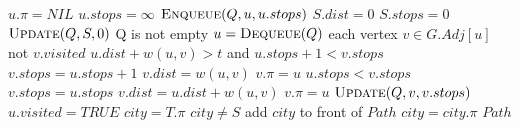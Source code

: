 \documentclass[11pt]{article}
\theoremstyle{nonumberplain}
\begin{document}
\begin{enumerate}
\begin{codebox}
\li     $u.\pi=NIL$
\li     $u.stops=\infty$
\li     $\textnormal{\scshape Enqueue}(Q,u,u.stops)$
    \End
\li $S.dist=0$
\li $S.stops=0$
\li $\textnormal{\scshape Update}(Q,S,0)$
\li \While Q is not empty \Do
\li     $u=\textnormal{\scshape Dequeue}(Q)$
\li     \For each vertex $v \in G.Adj[u]$ \Do
\li         \If not $v.visited$ \Do
\li             \If $u.dist+w(u,v)>t$ and $u.stops+1<v.stops$ \Do
\li                 $v.stops=u.stops+1$
\li                 $v.dist=w(u,v)$
\li                 $v.\pi=u$
\li             \Else \If $u.stops<v.stops$
\li                 $v.stops=u.stops$
\li                 $v.dist=u.dist+w(u,v)$
\li                 $v.\pi=u$
                \End
\li             $\textnormal{\scshape Update}(Q,v,v.stops)$
            \End
        \End
\li     $u.visited=TRUE$
    \End
\li $city=T.\pi$
\li \While $city \neq S$ \Do  
\li     add $city$ to front of $Path$
\li     $city=city.\pi$
    \End
\li \Return $Path$


\end{codebox}
\end{enumerate}
\end{document}
